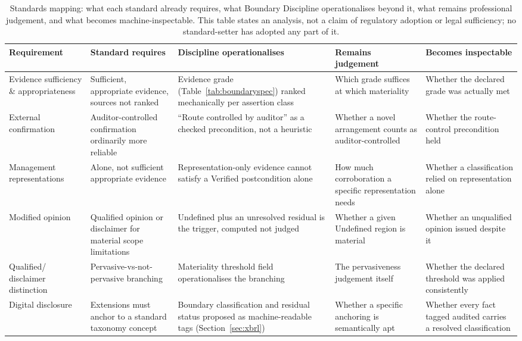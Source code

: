 \documentclass[11pt,a4paper]{article}
\theoremstyle{definition}
\theoremstyle{remark}
\begin{document}
\begin{table}[htbp]
\centering
\footnotesize
\begin{tabular}{>{\raggedright\arraybackslash}p{1.9cm}>{\raggedright\arraybackslash}p{2.6cm}>{\raggedright\arraybackslash}p{2.6cm}>{\raggedright\arraybackslash}p{2.3cm}>{\raggedright\arraybackslash}p{2.3cm}}
\toprule
\textbf{Requirement} & \textbf{Standard requires} & \textbf{Discipline operationalises} & \textbf{Remains judgement} & \textbf{Becomes inspectable} \\
\midrule
Evidence sufficiency \& appropriateness & Sufficient, appropriate evidence, sources not ranked \citep{isa500} & Evidence grade (Table~\ref{tab:boundaryspec}) ranked mechanically per assertion class & Which grade suffices at which materiality & Whether the declared grade was actually met \\
\addlinespace
External confirmation & Auditor-controlled confirmation ordinarily more reliable \citep{isa505} & ``Route controlled by auditor'' as a checked precondition, not a heuristic & Whether a novel arrangement counts as auditor-controlled & Whether the route-control precondition held \\
\addlinespace
Management representations & Alone, not sufficient appropriate evidence \citep{isa580} & Representation-only evidence cannot satisfy a Verified postcondition alone & How much corroboration a specific representation needs & Whether a classification relied on representation alone \\
\addlinespace
Modified opinion & Qualified opinion or disclaimer for material scope limitations \citep{isa705} & \textsf{Undefined} plus an unresolved residual is the trigger, computed not judged & Whether a given \textsf{Undefined} region is material & Whether an unqualified opinion issued despite it \\
\addlinespace
Qualified/ disclaimer distinction & Pervasive-vs-not-pervasive branching \citep{cas705, pcaob3105} & Materiality threshold field operationalises the branching & The pervasiveness judgement itself & Whether the declared threshold was applied consistently \\
\addlinespace
Digital disclosure & Extensions must anchor to a standard taxonomy concept \citep{esma2019esef} & Boundary classification and residual status proposed as machine-readable tags (Section~\ref{sec:xbrl}) & Whether a specific anchoring is semantically apt & Whether every fact tagged audited carries a resolved classification \\
\bottomrule
\end{tabular}
\caption{Standards mapping: what each standard already requires, what Boundary Discipline operationalises beyond it, what remains professional judgement, and what becomes machine-inspectable. This table states an analysis, not a claim of regulatory adoption or legal sufficiency; no standard-setter has adopted any part of it.}
\label{tab:standardsmap}
\end{table}
\end{document}
